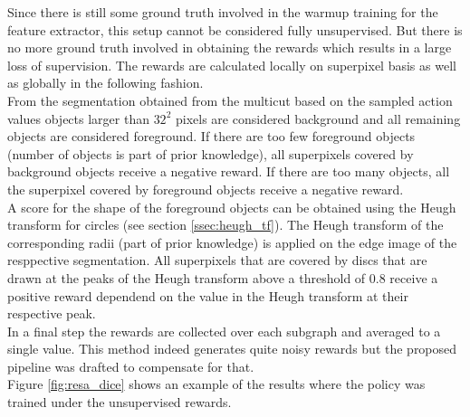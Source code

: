 Since there is still some ground truth involved in the warmup training for the feature extractor, this setup cannot be considered fully unsupervised. But there is no more ground truth involved in obtaining the rewards which results in a large loss of supervision. The rewards are calculated locally on superpixel basis as well as globally in the following fashion.\\
From the segmentation obtained from the multicut based on the sampled action values objects larger than $32^2$ pixels are considered background and all remaining objects are considered foreground. If there are too few foreground objects (number of objects is part of prior knowledge), all superpixels covered by background objects receive a negative reward. If there are too many objects, all the superpixel covered by foreground objects receive a negative reward.\\
A score for the shape of the foreground objects can be obtained using the Heugh transform for circles (see section \ref{ssec:heugh_tf}). The Heugh transform of the corresponding radii (part of prior knowledge) is applied on the edge image of the resppective segmentation. All superpixels that are covered by discs that are drawn at the peaks of the Heugh transform above a threshold of $0.8$ receive a positive reward dependend on the value in the Heugh transform at their respective peak.\\
In a final step the rewards are collected over each subgraph and averaged to a single value. This method indeed generates quite noisy rewards but the proposed pipeline was drafted to compensate for that.\\
Figure \ref{fig:resa_dice} shows an example of the results where the policy was trained under the unsupervised rewards.

